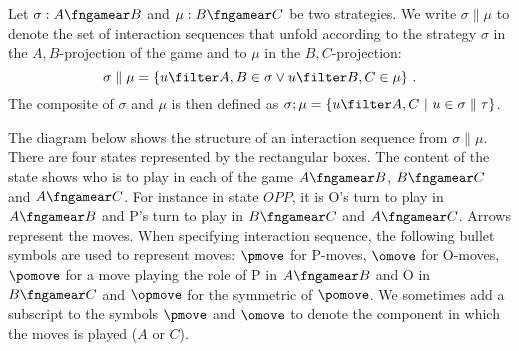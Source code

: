 Let $\sigma:A\fngamear B$ and $\mu:B\fngamear C$
be two strategies. We write $\sigma \parallel \mu$ to denote the
set of interaction sequences that unfold according to the strategy $\sigma$ in the $A,B$-projection of the game and
to $\mu$ in the $B,C$-projection:
$$ \sigma \parallel \mu = \{ u\filter A,B \in \sigma \vee u \filter B,C \in \mu \} \ .$$
The composite of $\sigma$ and $\mu$ is then defined as $\sigma ; \mu = \{ u \filter A,C \ | \ u \in \sigma \parallel \tau \}$.

The diagram below shows the structure of an interaction sequence
from $\sigma \parallel \mu$. There are four states represented by the rectangular boxes. The content of the state shows who is to play in each of the game $A\fngamear B$, $B\fngamear C$ and $A\fngamear C$.
For instance in state $OPP$, it is O's turn to play in
$A\fngamear B$ and P's turn to play in $B\fngamear C$ and $A\fngamear C$. Arrows represent the moves.
When specifying interaction sequence,
the following bullet symbols are used to represent moves:
$\pmove$ for P-moves, $\omove$ for O-moves, $\pomove$
for a move playing the role of P in $A\fngamear B$
and O in $B\fngamear C$ and $\opmove$ for
the symmetric of $\pomove$.
We sometimes add a subscript to the symbols $\pmove$ and $\omove$ to denote the component in which the moves is played ($A$ or $C$).


